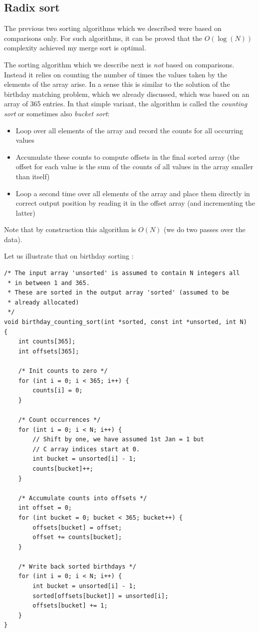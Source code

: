 \documentclass[12pt]{article}
\theoremstyle{plain}
\theoremstyle{remark}
\begin{document}
\subsection{Radix sort}

The previous two sorting algorithms which we described were based on comparisons
only. For such algorithms, it can be proved that the $O(\log(N))$ complexity
achieved my merge sort is optimal.

The sorting algorithm which we describe next is {\it not} based on
comparisons. Instead it relies on counting the number of times the values taken 
by the elements of the array arise. In a sense this is similar
to the solution of the birthday matching problem, which we already discussed,
which was based on an array of 365 entries. In that simple variant, the algorithm is called the
{\it counting sort} or sometimes also {\it bucket sort}: 

\begin{itemize}
	\item Loop over all elements of the array and record the counts for all
		occurring values
	\item Accumulate these counts to compute offsets in the final sorted
		array (the offset for each value is the sum of the counts of all
		values in the array smaller than itself)
	\item Loop a second time over all elements of the array and place them
		directly in correct output position by reading it in the offset
		array (and incrementing the latter)
\end{itemize}

Note that by construction this algorithm is $O(N)$ (we do two passes over the
data).

\medskip

Let us illustrate that on birthday sorting : 

\begin{lstlisting}[style=C]
/* The input array 'unsorted' is assumed to contain N integers all
 * in between 1 and 365.
 * These are sorted in the output array 'sorted' (assumed to be 
 * already allocated)
 */ 
void birthday_counting_sort(int *sorted, const int *unsorted, int N)
{
	int counts[365];
	int offsets[365];

	/* Init counts to zero */
	for (int i = 0; i < 365; i++) {
		counts[i] = 0;
	}

	/* Count occurrences */
	for (int i = 0; i < N; i++) {
		// Shift by one, we have assumed 1st Jan = 1 but
		// C array indices start at 0. 
		int bucket = unsorted[i] - 1;
		counts[bucket]++;
	}

	/* Accumulate counts into offsets */
	int offset = 0;
	for (int bucket = 0; bucket < 365; bucket++) {
		offsets[bucket] = offset;
		offset += counts[bucket];
	}

	/* Write back sorted birthdays */
	for (int i = 0; i < N; i++) {
		int bucket = unsorted[i] - 1;
		sorted[offsets[bucket]] = unsorted[i];
		offsets[bucket] += 1;
	}
}
\end{lstlisting}
\end{document}
